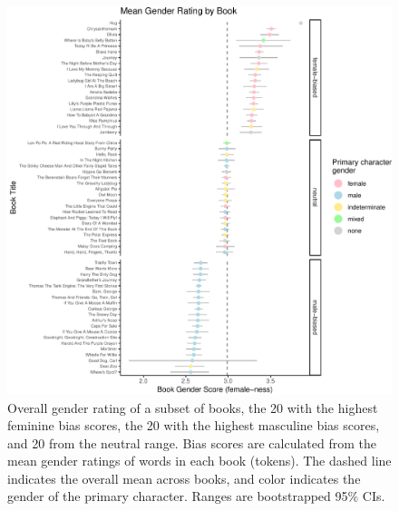 \documentclass[
  english,
  ,man,floatsintext]{apa6}
\begin{document}
\begin{figure}[b]
\includegraphics{kidbookgender_psych_sci_files/figure-latex/bookforest-1} \caption{Overall gender rating of  a subset of books, the 20 with the highest feminine bias scores, the 20 with the highest masculine bias scores, and 20 from the neutral range. Bias scores are calculated from the mean gender ratings of words in each book (tokens). The dashed line indicates the overall mean across books, and color indicates the gender of the primary character. Ranges are bootstrapped 95\% CIs.}\label{fig:bookforest}
\end{figure}
\end{document}
